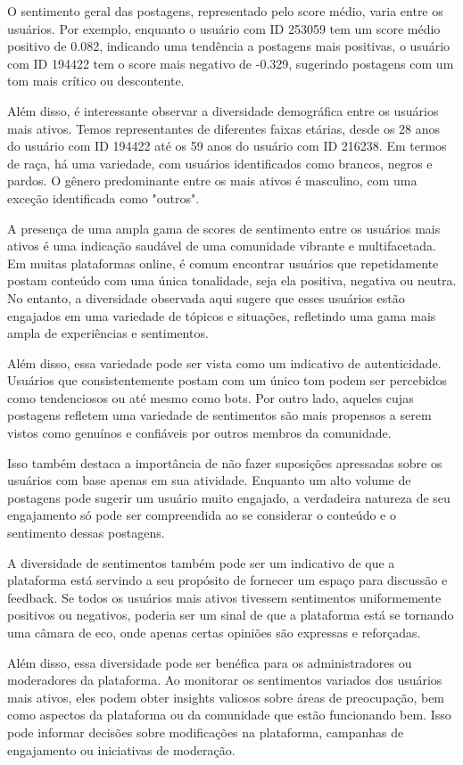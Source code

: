 O sentimento geral das postagens, representado pelo score médio, varia entre os usuários. Por exemplo, enquanto o usuário com ID 253059 tem um score médio positivo de 0.082, indicando uma tendência a postagens mais positivas, o usuário com ID 194422 tem o score mais negativo de -0.329, sugerindo postagens com um tom mais crítico ou descontente.

Além disso, é interessante observar a diversidade demográfica entre os usuários mais ativos. Temos representantes de diferentes faixas etárias, desde os 28 anos do usuário com ID 194422 até os 59 anos do usuário com ID 216238. Em termos de raça, há uma variedade, com usuários identificados como brancos, negros e pardos. O gênero predominante entre os mais ativos é masculino, com uma exceção identificada como "outros".

A presença de uma ampla gama de scores de sentimento entre os usuários mais ativos é uma indicação saudável de uma comunidade vibrante e multifacetada. Em muitas plataformas online, é comum encontrar usuários que repetidamente postam conteúdo com uma única tonalidade, seja ela positiva, negativa ou neutra. No entanto, a diversidade observada aqui sugere que esses usuários estão engajados em uma variedade de tópicos e situações, refletindo uma gama mais ampla de experiências e sentimentos.

Além disso, essa variedade pode ser vista como um indicativo de autenticidade. Usuários que consistentemente postam com um único tom podem ser percebidos como tendenciosos ou até mesmo como bots. Por outro lado, aqueles cujas postagens refletem uma variedade de sentimentos são mais propensos a serem vistos como genuínos e confiáveis por outros membros da comunidade.

Isso também destaca a importância de não fazer suposições apressadas sobre os usuários com base apenas em sua atividade. Enquanto um alto volume de postagens pode sugerir um usuário muito engajado, a verdadeira natureza de seu engajamento só pode ser compreendida ao se considerar o conteúdo e o sentimento dessas postagens.

A diversidade de sentimentos também pode ser um indicativo de que a plataforma está servindo a seu propósito de fornecer um espaço para discussão e feedback. Se todos os usuários mais ativos tivessem sentimentos uniformemente positivos ou negativos, poderia ser um sinal de que a plataforma está se tornando uma câmara de eco, onde apenas certas opiniões são expressas e reforçadas.

Além disso, essa diversidade pode ser benéfica para os administradores ou moderadores da plataforma. Ao monitorar os sentimentos variados dos usuários mais ativos, eles podem obter insights valiosos sobre áreas de preocupação, bem como aspectos da plataforma ou da comunidade que estão funcionando bem. Isso pode informar decisões sobre modificações na plataforma, campanhas de engajamento ou iniciativas de moderação.

